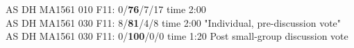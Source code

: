 AS DH MA1561 010 F11: 0/{\bf76}/7/17 time 2:00  \\
AS DH MA1561 030 F11: 8/{\bf81}/4/8 time 2:00 "Individual, pre-discussion vote" \\
AS DH MA1561 030 F11: 0/{\bf100}/0/0 time 1:20 Post small-group discussion vote \\
